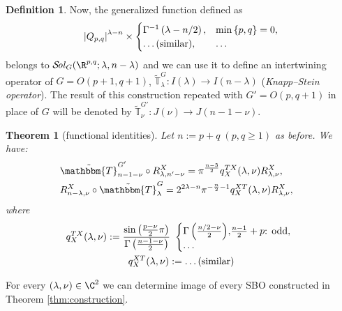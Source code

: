 \documentclass[portrait,final,paperwidth=90cm,paperheight=120cm,fontscale=0.3]{baposter}
\newcommand{\same}{\dots\mbox{(similar)}}
\newcommand{\assign}{:=}
\newtheorem{theorem}{Theorem}
\newcommand{\Sol}{\mathcal{S}\!{\it ol}}
\theoremstyle{definition}
\newtheorem{definition}{Definition}
\renewcommand{\Q}{Q_{p,q}}
\newcommand{\todd}{\mbox{\textrm{: odd}}}
\begin{document}
\begin{poster}
{\begin{definition}
		Now, the generalized function defined as
		\begin{equation*}
			\myabs{\Q}^{\lambda-n}\times\begin{cases}
				\Gamma^{-1}\left( \lambda-n/2 \right),&\min\left\{ p,q \right\}=0,\\
				\same,&\dots
			\end{cases}
		\end{equation*}
		belongs to $\Sol_G(\R^{p,q};\lambda,n-\lambda)$ and we can use it to
		define an intertwining operator of $G=O(p+1,q+1)$,
		$\tilde{\mathbb{T}}^{G}_{\lambda}:I(\lambda)\to
		I(n-\lambda)$
		(\textit{Knapp--Stein operator}).
		The result of this construction repeated with $G'=O(p,q+1)$ in place of $G$ will be denoted by $\tilde{\mathbb{T}}^{G'}_\nu:J(\nu)\to J(n-1-\nu)$.
	\end{definition}
	\begin{theorem}[functional identities]
		Let $n:=p+q\;(p,q\ge1)$ as before.
		We have:
\begin{eqnarray}
    & \tilde{\mathbbm{T}}^{G'}_{n-1 - \nu} \circ R^X_{\lambda, n' - \nu} =\pi^{\frac{n - 3}{2}} q^{T X}_X
  (\lambda, \nu) R^X_{\lambda, \nu}, &  \nonumber\\
  & R_{n - \lambda, \nu}^X \circ \tilde{\mathbbm{T}}^G_{\lambda} =2^{2\lambda-n}\pi^{-\frac{n}{2}-1} q^{X T}_X
  (\lambda, \nu) R_{\lambda, \nu}^X, &  \nonumber
  \end{eqnarray}
  where
  \begin{gather*}
  q^{T X}_X (\lambda, \nu) \assign\frac{\sin\left( \frac{p-\nu}{2} \pi\right)}{\Gamma\left( \frac{n-1-\nu}{2} \right)} \ \left\{
	  \begin{array}{@{}l@{}l}
    {\Gamma\left( \frac{n / 2 - \nu}{2} \right)}, & \frac{n - 1}{2}+p\todd,\\
    \dots&
  \end{array} \right.\\
  q^{X T}_X (\lambda, \nu) \assign\same
\end{gather*}
	\end{theorem}
}
{
	For every $(\lambda,\nu)\in\C^2$ we can determine image of every SBO constructed in Theorem \ref{thm:construction}.
}

\end{poster}
\end{document}
